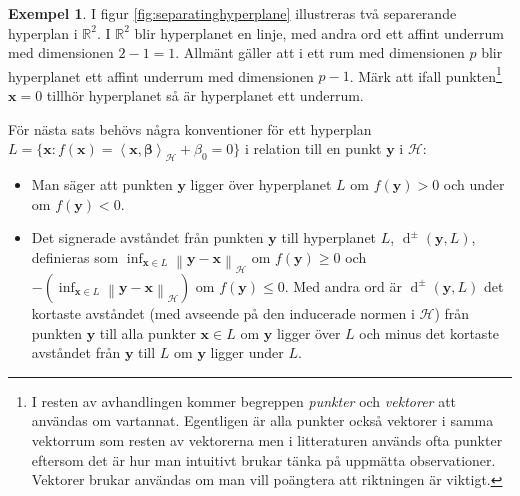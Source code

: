 \documentclass[a4paper, 12pt]{report}
\theoremstyle{definition}
\newtheorem{ex}{Exempel}[section]
\theoremstyle{remark}
\newcommand{\bfbeta}{{\boldsymbol{\beta}}}
\newcommand{\bfx}{\mathbf{x}}
\newcommand{\bfy}{\mathbf{y}}
\newcommand{\llangle}{\left\langle}
\newcommand{\rrangle}{\right\rangle}
\newcommand{\sephyp}{\{ \mathbf{x} : f\left(\mathbf{x}\right)=\inner{\bfx}{\bfbeta}_\mathcal{H} + \beta_0=0\}}
\newcommand{\inner}[2]{\llangle #1, #2 \rrangle}
\newcommand{\hil}{\mathcal{H}}
\begin{document}
\begin{ex}
	I figur \ref{fig:separatinghyperplane} illustreras två separerande hyperplan i $\mathbb{R}^2$. I $\mathbb{R}^2$ blir hyperplanet en linje, med andra ord ett affint underrum med dimensionen $2-1=1$.
	Allmänt gäller att i ett rum med dimensionen $p$ blir hyperplanet ett affint underrum med dimensionen $p-1$.
	Märk att ifall punkten\footnote{I resten av avhandlingen kommer begreppen \emph{punkter} och \emph{vektorer} att användas om vartannat. Egentligen är alla punkter också vektorer i samma vektorrum som resten av vektorerna men i litteraturen används ofta punkter eftersom det är hur man intuitivt brukar tänka på uppmätta observationer. Vektorer brukar användas om man vill poängtera att riktningen är viktigt.} $\bfx = 0$ tillhör hyperplanet så är hyperplanet ett underrum.
\end{ex}

För nästa sats behövs några konventioner för ett hyperplan $L=\sephyp$ i relation till en punkt
$\bfy$ i $\hil$:
\begin{itemize}
	\item Man säger att punkten $\bfy$ ligger över hyperplanet $L$ om $f\left(\bfy\right)>0$ och under om $f\left(\bfy\right)<0$.
	\item Det signerade avståndet från punkten $\bfy$ till hyperplanet $L$, $\operatorname{d}^\pm\!\left(\bfy, L\right)$, definieras som $\inf_{\bfx\in L} \left\|\bfy-\bfx\right\|_\hil$ om $f\left(\bfy\right)\geq0$ och $-\left(\inf_{\bfx\in L} \left\|\bfy-\bfx\right\|_\hil\right)$ om $f\left(\bfy\right)\leq0$.
	Med andra ord är $\operatorname{d}^\pm\left(\bfy,L\right)$ det kortaste avståndet (med avseende på den inducerade normen i $\hil$) från punkten $\bfy$ till alla punkter $\bfx\in L$ om $\bfy$ ligger över $L$ och minus det kortaste avståndet från $\bfy$ till $L$ om $\bfy$ ligger under $L$.
\end{itemize}
\end{document}

